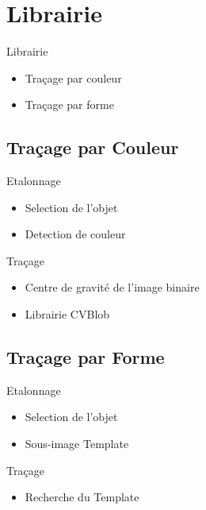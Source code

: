 \documentclass{beamer}
\begin{document}
	\section{Librairie}
		
		\begin{frame}{Librairie}
				\begin{itemize}
					\item{Traçage par couleur}
					\item{Traçage par forme}
				\end{itemize}
		\end{frame}

		\subsection{Traçage par Couleur}
		\begin{frame}{Etalonnage}
				\begin{itemize}
					\item{Selection de l'objet}
					\item{Detection de couleur}
				\end{itemize}
		\end{frame}

		\begin{frame}{Traçage}
				\begin{itemize}
					\item{Centre de gravité de l'image binaire}
					\item{Librairie CVBlob}
				\end{itemize}
		\end{frame}

		\subsection{Traçage par Forme}
		\begin{frame}{Etalonnage}
				\begin{itemize}
					\item{Selection de l'objet}
					\item{Sous-image Template}
				\end{itemize}
		\end{frame}

		\begin{frame}{Traçage}
				\begin{itemize}
					\item{Recherche du Template}
				\end{itemize}
		\end{frame}
	
\end{document}
